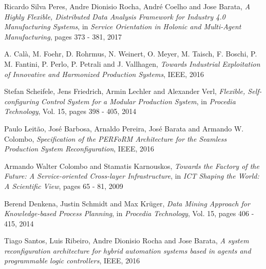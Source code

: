 \documentclass[conference,compsoc,hidelinks]{IEEEtran}
\begin{document}
\begin{thebibliography}{1}
	
Ricardo Silva Peres, Andre Dionisio Rocha, André Coelho and Jose Barata, \emph{A Highly Flexible, Distributed Data Analysis Framework for Industry 4.0 Manufacturing Systems}, in \emph{Service Orientation in Holonic and Multi-Agent Manufacturing}, pages 373 - 381, 2017

A. Calà, M. Foehr, D. Rohrmus, N. Weinert, O. Meyer, M. Taisch, F. Boschi, P. M. Fantini, P. Perlo, P. Petrali and J. Vallhagen, \emph{Towards Industrial Exploitation of Innovative and Harmonized Production Systems}, IEEE, 2016

Stefan Scheifele, Jens Friedrich, Armin Lechler and Alexander Verl, \emph{Flexible, Self-configuring Control System for a Modular Production System},
in \emph{Procedia Technology}, Vol. 15, pages 398 - 405, 2014

Paulo Leitão, José Barbosa, Arnaldo Pereira, José Barata  and Armando W. Colombo, \emph{Specification of the PERFoRM Architecture for the Seamless Production System Reconfiguration}, IEEE, 2016

Armando Walter Colombo and Stamatis Karnouskos,
\emph{Towards the Factory of the Future: A Service-oriented Cross-layer Infrastructure}, in \emph{ICT Shaping the World: A Scientific View}, pages 65 - 81, 2009

Berend Denkena, Justin Schmidt and Max Krüger,
\emph{Data Mining Approach for Knowledge-based Process Planning}, in \emph{Procedia Technology}, Vol. 15, pages 406 - 415, 2014

Tiago Santos, Luis Ribeiro, Andre Dionisio Rocha and Jose Barata, \emph{A system reconfiguration architecture for hybrid automation systems based in agents and programmable logic controllers}, IEEE, 2016

\end{thebibliography}

\end{document}
